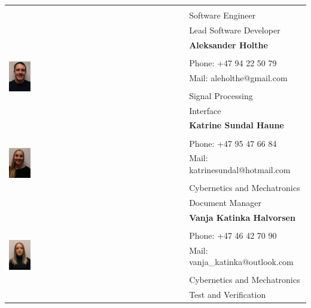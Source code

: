 \begin{center}
\begin{tabular}{|l|l|}
 &   \\
 & Software Engineer  \\
 & Lead Software Developer  \\ \hline
 \multirow{7}{*}{\includegraphics[width = 0.125\textwidth]{VAPIQ-PICTURES/alex}} & \textbf{Aleksander Holthe}  \\
 &   \\
 & Phone: +47 94 22 50 79  \\
 & Mail: aleholthe@gmail.com  \\
 &   \\
 &  Signal Processing \\
 &  Interface \\ \hline
 \multirow{7}{*}{\includegraphics[width = 0.125\textwidth]{VAPIQ-PICTURES/katrine}} & \textbf{Katrine Sundal Haune}  \\
 &   \\
 & Phone: +47 95 47 66 84  \\
 & Mail: katrinesundal@hotmail.com  \\
 &   \\
 & Cybernetics and Mechatronics  \\
 & Document Manager \\ \hline
 \multirow{7}{*}{\includegraphics[width = 0.125\textwidth]{VAPIQ-PICTURES/vanja}} & \textbf{Vanja Katinka Halvorsen}  \\
 &   \\
 & Phone: +47 46 42 70 90  \\
 & Mail: vanja{\_}katinka@outlook.com  \\
 &   \\
 & Cybernetics and Mechatronics  \\
 & Test and Verification  \\ 
 \hline
    \end{tabular}
    \end{center}
\newpage

